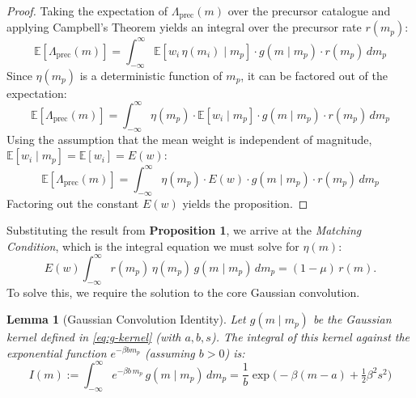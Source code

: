 \documentclass[linenum,doublespace,onecolumn]{SSA-SRL}
\theoremstyle{lemma}
\newtheorem{lemma}{Lemma}
\newcommand{\E}{\mathbb{E}}
\begin{document}
\begin{proof}
Taking the expectation of \(\Lambda_{\mathrm{prec}}(m)\) over the precursor catalogue and applying Campbell's Theorem yields an integral over the precursor rate \(r(m_p)\):
\[
\E[\Lambda_{\mathrm{prec}}(m)] = \int_{-\infty}^{\infty} \E[w_i \, \eta(m_i) \mid m_p] \cdot g(m \mid m_p) \cdot r(m_p) \, dm_p
\]
Since \(\eta(m_p)\) is a deterministic function of \(m_p\), it can be factored out of the expectation:
\[
\E[\Lambda_{\mathrm{prec}}(m)] = \int_{-\infty}^{\infty} \eta(m_p) \cdot \E[w_i \mid m_p] \cdot g(m \mid m_p) \cdot r(m_p) \, dm_p
\]
Using the assumption that the mean weight is independent of magnitude, \(\E[w_i \mid m_p] = \E[w_i] = E(w)\):
\[
\E[\Lambda_{\mathrm{prec}}(m)] = \int_{-\infty}^{\infty} \eta(m_p) \cdot E(w) \cdot g(m \mid m_p) \cdot r(m_p) \, dm_p
\]
Factoring out the constant \(E(w)\) yields the proposition.
\end{proof}

Substituting the result from \textbf{Proposition 1}, we arrive at the \emph{Matching Condition}, which is the integral equation we must solve for $\eta(m)$:
\begin{equation}\label{eq:eta-match}
E(w)\int_{-\infty}^{\infty} r(m_p)\,\eta(m_p)\,g(m\mid m_p)\,dm_p=(1-\mu)\,r(m).
\end{equation}
To solve this, we require the solution to the core Gaussian convolution.

\begin{lemma}[Gaussian Convolution Identity]
Let \(g(m \mid m_p)\) be the Gaussian kernel defined in \eqref{eq:g-kernel} (with \(a, b, s\)). The integral of this kernel against the exponential function \(e^{-\beta b m_p}\) (assuming \(b>0\)) is:
\[
I(m) := \int_{-\infty}^{\infty} e^{-\beta b\,m_p} \, g(m\mid m_p) \,dm_p = \frac{1}{b}\exp\!\Big(-\beta(m-a)+\tfrac{1}{2}\beta^2 s^2\Big)
\]
\end{lemma}
\end{document}
